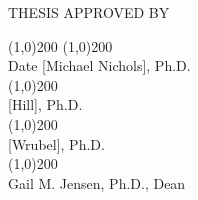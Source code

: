 \begin{titlepage}

	\begin{center}

		THESIS APPROVED BY\\
		\vspace{1.5cm}
    \end{center}
		\line(1,0){200} \hspace{2cm} \line(1,0){200} \\	
		Date \hspace{8cm} [Michael Nichols], Ph.D.
		\vspace{1.5cm}\\
        \null \hspace{9cm} \line(1,0){200} \\	
		\null \hspace{9cm} [Hill], Ph.D.
        \vspace{1.5cm}\\
		\null \hspace{9cm} \line(1,0){200} \\	
		\null \hspace{9cm} [Wrubel], Ph.D.
        \vspace{2.5cm}\\
		\null \hspace{9cm} \line(1,0){200} \\	
		\null \hspace{9cm} Gail M. Jensen, Ph.D., Dean
	

\end{titlepage}
